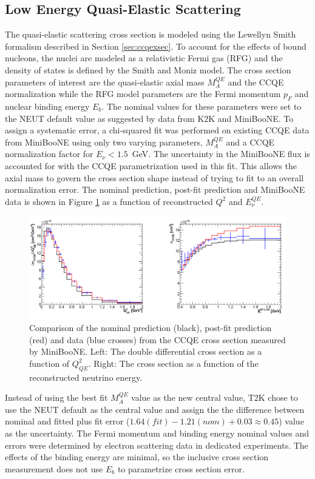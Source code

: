 \subsection{Low Energy Quasi-Elastic Scattering}

The quasi-elastic scattering cross section is modeled using the Lewellyn Smith\cite{LSCCQE} formalism described in Section \ref{sec:ccqexsec}. To account for the effects of bound nucleons, the nuclei are modeled as a relativistic Fermi gas (RFG) and the density of states is defined by the Smith and Moniz\cite{RFG} model. The cross section parameters of interest are the quasi-elastic axial mass $M_A^{QE}$ and the CCQE normalization while the RFG model parameters are the Fermi momentum $p_F$ and nuclear binding energy $E_b$. The nominal values for these parameters were set to the NEUT default value as suggested by data from K2K and MiniBooNE. To assign a systematic error, a chi-squared fit was performed on existing CCQE data from MiniBooNE using only two varying parameters, $M_A^{QE}$ and a CCQE normalization factor for $E_\nu < 1.5$~GeV. The uncertainty in the MiniBooNE flux is accounted for with the CCQE parametrization used in this fit. This allows the axial mass to govern the cross section shape instead of trying to fit to an overall normalization error. The nominal prediction, post-fit prediction and MiniBooNE data is shown in Figure \ref{fig:ccqefit} as a function of reconstructed $Q^2$ and $E_\nu^{QE}$.

\begin{figure}
\centering
\includegraphics[width=6in]{Figures/ccqefit.PNG}
\caption{Comparison of the nominal prediction (black), post-fit prediction (red) and data (blue crosses) from the CCQE cross section measured by MiniBooNE. Left: The double differential cross section as a function of $Q^2_{QE}$. Right: The cross section as a function of the reconstructed neutrino energy.} 
\label{fig:ccqefit}
\end{figure}

Instead of using the best fit $M_A^{QE}$ value as the new central value, T2K chose to use the NEUT default as the central value and assign the the difference between nominal and fitted plus fit error ($1.64(fit) - 1.21(nom) +0.03 \approx 0.45$) value as the uncertainty\cite{xsectn}. The Fermi momentum and binding energy nominal values and errors were determined by electron scattering data in dedicated experiments. The effects of the binding energy are minimal, so the inclusive cross section measurement does not use $E_b$ to parametrize cross section error.

